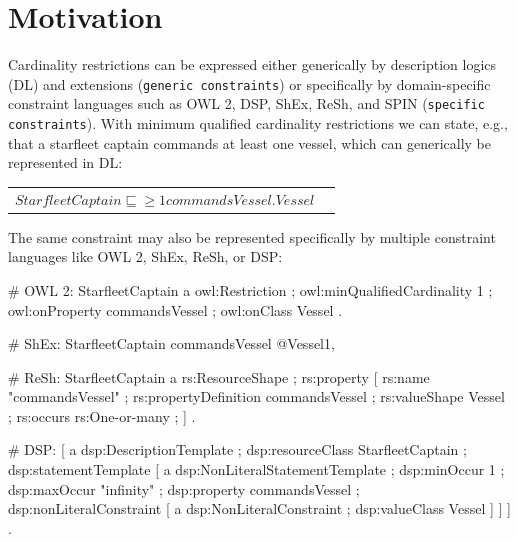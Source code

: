 \documentclass{llncs}
\newcommand{\ms}[1]{\texttt{#1}}
\newenvironment{DL}{
  \vspace{0cm}
	\begin{center}
  \begin{tabular}{r l}

}{
  \end{tabular}
	\end{center}
}
\begin{document}


\section{Motivation}

Cardinality restrictions can be expressed either generically by description logics (DL) and extensions (\ms{generic constraints}) 
or specifically  by domain-specific constraint languages such as OWL 2, DSP, ShEx, ReSh, and SPIN (\ms{specific constraints}).
With minimum qualified cardinality restrictions we can state, 
e.g., that a starfleet captain commands at least one vessel, which can generically be represented in DL:

\begin{DL}
$StarfleetCaptain \sqsubseteq \geq1 commandsVessel . Vessel $
\end{DL}

The same constraint may also be represented specifically by multiple constraint languages like OWL 2, ShEx, ReSh, or DSP:

\begin{ex}
# OWL 2:
StarfleetCaptain
    a owl:Restriction ;
    owl:minQualifiedCardinality 1 ;
    owl:onProperty commandsVessel ;
    owl:onClass Vessel .
		
# ShEx:
StarfleetCaptain { commandsVessel @Vessel{1, } }

# ReSh:
StarfleetCaptain a rs:ResourceShape ; rs:property [
    rs:name "commandsVessel" ; rs:propertyDefinition commandsVessel ;
    rs:valueShape Vessel ;
    rs:occurs rs:One-or-many ; ] .
		
# DSP:
[   a dsp:DescriptionTemplate ; 
    dsp:resourceClass StarfleetCaptain ; 
    dsp:statementTemplate [ a dsp:NonLiteralStatementTemplate ;
        dsp:minOccur 1 ; dsp:maxOccur "infinity" ; 
        dsp:property commandsVessel ; 
        dsp:nonLiteralConstraint [ a dsp:NonLiteralConstraint ;
            dsp:valueClass Vessel ] ] ] .
\end{ex}
\end{document}
